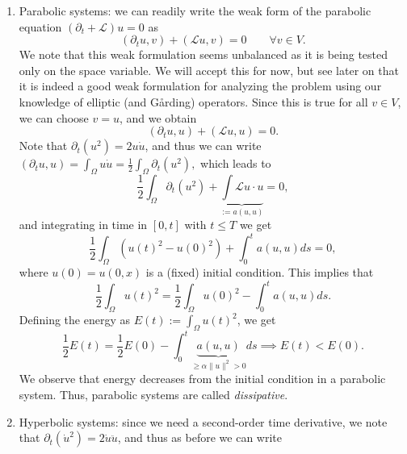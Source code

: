\documentclass{article}
\begin{document}
\begin{enumerate}
    \item Parabolic systems: we can readily write the weak form of the parabolic equation $(\partial_t + \mathcal{L})u=0$ as
    \begin{equation*}
        (\partial_t u, v) + (\mathcal{L}u, v) = 0 \qquad \forall v\in V.
    \end{equation*}
    We note that this weak formulation seems unbalanced as it is being tested only on the space variable. We will accept this for now, but see later on that it is indeed a good weak formulation for analyzing the problem using our knowledge of elliptic (and Gårding) operators. Since this is true for all $v\in V$, we can choose $v=u$, and we obtain
    \begin{equation*}
        (\partial_t u, u) + (\mathcal{L}u,u) = 0.
    \end{equation*}
    Note that $\partial_t(u^2) = 2u\dot{u}$, and thus we can write $(\partial_t u, u) = \int_\Omega u\dot{u} = \frac{1}{2}\int_\Omega \partial_t (u^2),$ which leads to
    \begin{equation*}
        \frac{1}{2}\int_\Omega \partial_t (u^2) + \underbrace{\int \mathcal{L}u \cdot u}_{:= a(u,u)} = 0, 
    \end{equation*}
    and integrating in time in $[0,t]$ with $t\leq T$ we get
    \begin{equation*}
        \frac{1}{2} \int_\Omega (u(t)^2-u(0)^2)  + \int_0^t a(u,u)ds = 0,
    \end{equation*}
    where $u(0) = u(0,x)$ is a (fixed) initial condition. This implies that
    \begin{equation*}
        \frac{1}{2}\int_\Omega u(t)^2 =  \frac{1}{2} \int_\Omega u(0)^2 - \int_0^t a(u,u)ds.
    \end{equation*}
    Defining the energy as $E(t) := \int_\Omega u(t)^2$, we get
    \begin{equation*}
        \frac{1}{2}E(t) = \frac{1}{2}E(0) - \int_0^t \underbrace{a(u,u)}_{\geq \alpha\|u\|^2>0} ds \implies \boxed{E(t) < E(0)}.
    \end{equation*}
    We observe that energy decreases from the initial condition in a parabolic system. Thus, parabolic systems are called \textit{dissipative}.
    \item Hyperbolic systems: since we need a second-order time derivative, we note that $\partial_t(\dot{u}^2) = 2\dot{u}\ddot{u}$, and thus as before we can write
    \begin{equation*}

\end{equation*}
\end{enumerate}
\end{document}
